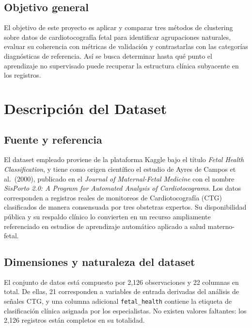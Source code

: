 \documentclass[12pt,letterpaper]{article}
\begin{document}
\subsection{Objetivo general}

El objetivo de este proyecto es aplicar y comparar tres métodos de clustering sobre datos de cardiotocografía fetal para identificar agrupaciones naturales, evaluar su coherencia con métricas de validación y contrastarlas con las categorías diagnósticas de referencia. Así se busca determinar hasta qué punto el aprendizaje no supervisado puede recuperar la estructura clínica subyacente en los registros.

\section{Descripción del Dataset}

\subsection{Fuente y referencia}

El dataset empleado proviene de la plataforma Kaggle bajo el título \textit{Fetal Health
Classification}, y tiene como origen científico el estudio de Ayres de Campos et al.\ (2000),
publicado en el \textit{Journal of Maternal-Fetal Medicine} con el nombre \textit{SisPorto 2.0:
A Program for Automated Analysis of Cardiotocograms}. Los datos corresponden a registros reales
de monitoreos de Cardiotocografía (CTG) clasificados de manera consensuada por tres obstetras
expertos. Su disponibilidad pública y su respaldo clínico lo convierten en un recurso ampliamente
referenciado en estudios de aprendizaje automático aplicado a salud materno-fetal.

\subsection{Dimensiones y naturaleza del dataset}

El conjunto de datos está compuesto por 2,126 observaciones y 22 columnas en total. De ellas, 21
corresponden a variables de entrada derivadas del análisis de señales CTG, y una columna adicional
\texttt{fetal\_health} contiene la etiqueta de clasificación clínica asignada por los
especialistas. No existen valores faltantes: los 2,126 registros están completos en su totalidad.
\end{document}
